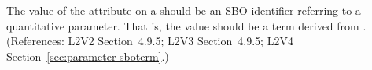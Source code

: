 The value of the  attribute on a \Parameter should be an SBO
identifier referring to a quantitative parameter.  That is, the value should
be a term derived from \sboparameter.  (References: L2V2 Section~4.9.5; L2V3
Section~4.9.5; L2V4 Section~\ref{sec:parameter-sboterm}.)
